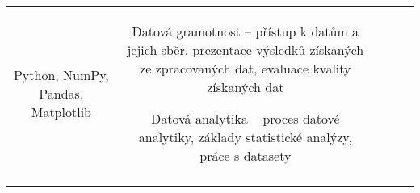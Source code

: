 \begin{landscape}
\begin{table}[htbp]
{\begin{tabularx}{\linewidth}{CCCCC}
Python, NumPy, Pandas, Matplotlib

&

Datová gramotnost – přístup k datům a jejich sběr, prezentace výsledků získaných ze zpracovaných dat, evaluace kvality získaných dat

Datová analytika – proces datové analytiky, základy statistické analýzy, práce s datasety

\\

\tabularnewline
\bottomrule
\end{tabularx}

}

\end{table}

\end{landscape}
